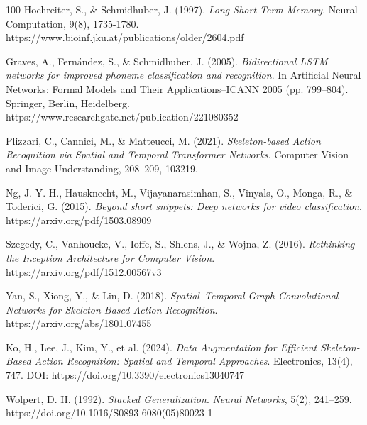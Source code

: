 \documentclass[journal,onecolumn, 11pt]{IEEEtran}
\begin{document}
\begin{thebibliography}{100}
Hochreiter, S., \& Schmidhuber, J. (1997). 
\textit{Long Short-Term Memory}. Neural Computation, 9(8), 1735-1780. https://www.bioinf.jku.at/publications/older/2604.pdf

Graves, A., Fernández, S., \& Schmidhuber, J. (2005). 
\textit{Bidirectional LSTM networks for improved phoneme classification and recognition}. In Artificial Neural Networks: Formal Models and Their Applications–ICANN 2005 (pp. 799–804). Springer, Berlin, Heidelberg.
https://www.researchgate.net/publication/221080352

Plizzari, C., Cannici, M., \& Matteucci, M. (2021). 
\textit{Skeleton-based Action Recognition via Spatial and Temporal Transformer Networks}. 
Computer Vision and Image Understanding, 208–209, 103219.

Ng, J. Y.-H., Hausknecht, M., Vijayanarasimhan, S., Vinyals, O., Monga, R., \& Toderici, G. (2015). \textit{Beyond short snippets: Deep networks for video classification}.
https://arxiv.org/pdf/1503.08909

Szegedy, C., Vanhoucke, V., Ioffe, S., Shlens, J., \& Wojna, Z. (2016).
\textit{Rethinking the Inception Architecture for Computer Vision}.
https://arxiv.org/pdf/1512.00567v3

Yan, S., Xiong, Y., \& Lin, D. (2018).
\textit{Spatial–Temporal Graph Convolutional Networks for Skeleton-Based Action Recognition}.
https://arxiv.org/abs/1801.07455

Ko, H., Lee, J., Kim, Y., et al. (2024). 
\textit{Data Augmentation for Efficient Skeleton-Based Action Recognition: Spatial and Temporal Approaches}. 
Electronics, 13(4), 747. 
DOI: \url{https://doi.org/10.3390/electronics13040747}

Wolpert, D. H. (1992). \textit{Stacked Generalization}. \emph{Neural Networks}, 5(2), 241–259. https://doi.org/10.1016/S0893-6080(05)80023-1




\end{thebibliography}
\end{document}

